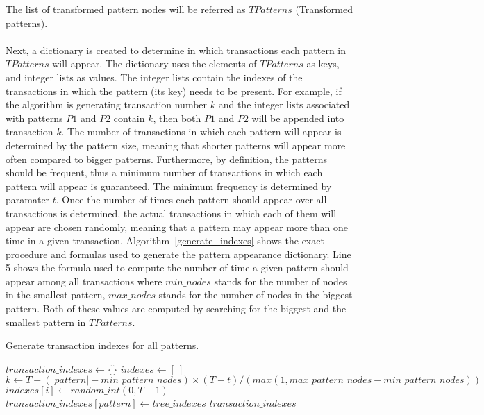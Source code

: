 \documentclass{acm_proc_article-sp-sigmod09}
\begin{document}
The list of transformed pattern nodes will be referred as $TPatterns$ (Transformed patterns).
\\\\
Next, a dictionary is created to determine in which transactions each pattern in $TPatterns$ will appear. The dictionary uses the elements of $TPatterns$ as keys, and integer lists as values. The integer lists contain the indexes of the transactions in which the pattern (its key) needs to be present. For example, if the algorithm is generating transaction number $k$ and the integer lists associated with patterns $P1$ and $P2$ contain $k$, then both $P1$ and $P2$ will be appended into transaction $k$. The number of transactions in which each pattern will appear is determined by the pattern size, meaning that shorter patterns will appear more often compared to bigger patterns. Furthermore, by definition, the patterns should be frequent, thus a minimum number of transactions in which each pattern will appear is guaranteed. The minimum frequency is determined by paramater $t$. Once the number of times each pattern should appear over all transactions is determined, the actual transactions in which each of them will appear are chosen randomly, meaning that a pattern may appear more than one time in a given transaction. Algorithm~\ref{generate_indexes} shows the exact procedure and formulas used to generate the pattern appearance dictionary. Line 5 shows the formula used to compute the number of time a given pattern should appear among all transactions where $min\_nodes$ stands for the number of nodes in the smallest pattern, $max\_nodes$ stands for the number of nodes in the biggest pattern. Both of these values are computed by searching for the biggest and the smallest pattern in $TPatterns$.
\begin{algorithm}
\caption{Generate transaction indexes for all patterns.}
\label{generate_indexes}
\begin{algorithmic}[1]
\State $transaction\_indexes \gets \{\}$
	\State $indexes \gets [\:]$
	\State $k \gets T - (|pattern| - min\_pattern\_nodes) \times (T - t) / (max(1, max\_pattern\_nodes - min\_pattern\_nodes))$
	\State $indexes[i] \gets random\_int(0, T - 1)$
	\EndFor
	\State $transaction\_indexes[pattern] \gets tree\_indexes$
\EndFor
\Return $transaction\_indexes$
\EndFunction
\end{algorithmic}
\end{algorithm}
\end{document}
